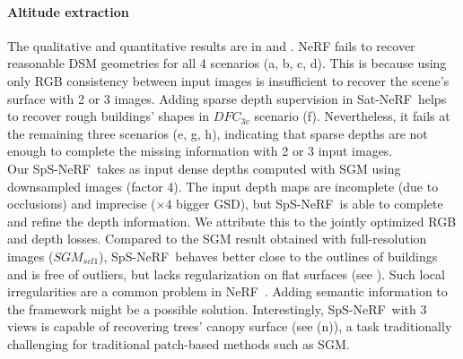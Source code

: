 \documentclass{isprs} %
\newcommand{\Nerf}{{NeRF}}
\newcommand{\OurNeRFShort}{{SpS-NeRF}}
\begin{document}
\paragraph{Altitude extraction}
The qualitative and quantitative results are in  and . NeRF fails to recover reasonable DSM geometries for all  4 scenarios (a, b, c, d). This is because using only RGB consistency between input images is insufficient to recover the scene's surface with 2 or 3 images. Adding sparse depth supervision in Sat-\Nerf~helps to recover rough buildings' shapes in $DFC_{3v}$ scenario (f). Nevertheless, it fails at the remaining three scenarios (e, g, h), indicating that sparse depths are not enough to complete the missing information with 2 or 3 input images.\\ 
%
%
Our \OurNeRFShort~takes as input dense depths computed with SGM using downsampled images (factor 4). The input depth maps are incomplete (due to occlusions) and imprecise ($\times4$ bigger GSD), but \OurNeRFShort~is able to complete and refine the depth information. We attribute this to the jointly optimized RGB and depth losses. Compared to the SGM result obtained with full-resolution images ($SGM_{scl1}$), \OurNeRFShort~behaves better close to the outlines of buildings and is free of outliers, but lacks regularization on flat surfaces (see ). Such local irregularities are a common problem in \Nerf~\cite{mari2022sat}. Adding semantic information to the framework might be a possible solution. Interestingly, \OurNeRFShort~with 3 views is capable of recovering trees' canopy surface (see  (n)), a task traditionally challenging for traditional patch-based methods such as SGM.\\
%
\end{document}
